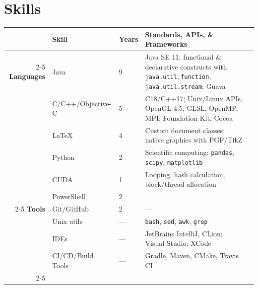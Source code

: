 \documentclass[10pt,sans,dvipsnames,hyperref,table]{moderncv}
\begin{document}
\section{Skills}
\setlength{\tabcolsep}{3pt}
{\small\begin{tabularx}{\textwidth}{@{}rllXX@{}}
		                   & \textbf{Skill}    & \textbf{Years} & \textbf{Standards, APIs, \& Frameworks}                                                                             \\ \cmidrule(l){2-5}
		\textbf{Languages} & Java              & 9              & Java SE 11; functional \& declarative constructs with \texttt{java.util.function}, \texttt{java.util.stream}; Guava \\[3pt]
		\textbf{}          & C/C++/Objective-C & 5              & C18/C++17; Unix/Linux APIs, OpenGL 4.5, GLSL, OpenMP, MPI; Foundation Kit, Cocoa                                    \\[3pt]
		\textbf{}          & LaTeX             & 4              & Custom document classes; native graphics with PGF/TikZ                                                              \\[3pt]
		\textbf{}          & Python            & 2              & Scientific computing: \texttt{pandas}, \texttt{scipy}, \texttt{matplotlib}                                          \\[3pt]
		\textbf{}          & CUDA              & 1              & Looping, hash calculation, block/thread allocation                                                                  \\[3pt]
		\textbf{}          & PowerShell        & 2              &                                                                                                                     \\[3pt] \cmidrule(l){2-5}
		\textbf{Tools}     & Git/GitHub        & 2              & ---                                                                                                                 \\[3pt]
		\textbf{}          & Unix utils        & ---            & \texttt{bash}, \texttt{sed}, \texttt{awk}, \texttt{grep}                                                            \\[3pt]
		\textbf{}          & IDEs              & ---            & JetBrains IntelliJ, CLion; Visual Studio; XCode                                                                     \\[3pt]
		\textbf{}          & CI/CD/Build Tools & ---            & Gradle, Maven, CMake, Travis CI                                                                                     \\ \cmidrule(l){2-5}
	\end{tabularx}
}
\setlength{\tabcolsep}{0pt}
\vspace{-0.5cm}
\end{document}
